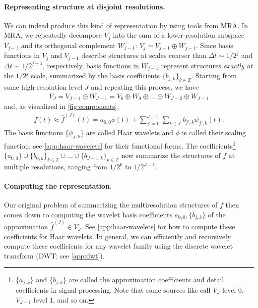 \documentclass{article}
\theoremstyle{plain}
\theoremstyle{definition}
\theoremstyle{remark}
\newcommand{\prepar}{\vspace{-0.1in}}
\begin{document}
\paragraph{Representing structure at disjoint resolutions.}
We can indeed produce this kind of representation by using tools from MRA.
In MRA, we repeatedly decompose $V_j$ into the sum of a lower-resolution subspace $V_{j-1}$ and its orthogonal complement $W_{j-1}$: $V_j = V_{j-1} \oplus W_{j - 1}$.
Since basis functions in $V_{j}$ and $V_{j-1}$ describe structures at scales coarser than $\Delta t \sim 1/2^{j}$ and $\Delta t \sim 1/2^{j-1}$, respectively, basis functions in $W_{j-1}$ represent structures \emph{exactly at} the $1/2^j$ scale, summarized by the basis coefficients $\{b_{j,k}\}_{k\in \mathbb{Z}}$.
Starting from some high-resolution level $J$ and repeating this process, we have 
\begin{align*}
    V_J = V_{J-1} \oplus W_{J-1} = V_0 \oplus W_0 \oplus \ldots \oplus W_{J-2} \oplus W_{J - 1}
\end{align*}
and, as visualized in \cref{fig:components},
\begin{align} \label{eq:wavelet-series}
f(t) \approx \hat{f}^{(J)}(t) = a_{0,0} \phi(t) + \sum_{j'=0}^{J-1} \sum_{k\in \mathbb Z} b_{j',k} \psi_{j',k}(t).
\end{align}
The basis functions $\{\psi_{j,k}\}$ are called Haar wavelets and $\phi$ is called their scaling function; see \cref{app:haar-wavelets} for their functional forms. 
The coefficients\footnote{$\{a_{j,k}\}$ and $\{b_{j,k}\}$ are called the approximation coefficients and detail coefficients in signal processing. Note that some sources like \citet{Lee2019PyWaveletsPythonPackage} call $V_J$ level 0, $V_{J-1}$ level 1, and so on.} $\{a_{0,0}\} \cup \{b_{0,k}\}_{k\in \mathbb{Z}} \cup \ldots \cup \{b_{J-1,k}\}_{k\in \mathbb{Z}}$ now summarize the structures of $f$ at multiple resolutions, ranging from $1/2^0$ to $1/2^{J-1}$.


\prepar
\paragraph{Computing the representation.}
Our original problem of summarizing the multiresolution structures of $f$ then comes down to computing the wavelet basis coefficients $a_{0,0}, \{b_{j,k}\}$ of the approximation $\hat{f}^{(J)} \in V_J$.
See \cref{app:haar-wavelets} for how to compute these coefficients for Haar wavelets.
In general, we can efficiently and recursively compute these coefficients for any wavelet family using the discrete wavelet transform (DWT; see \cref{app:dwt}). 
\end{document}
